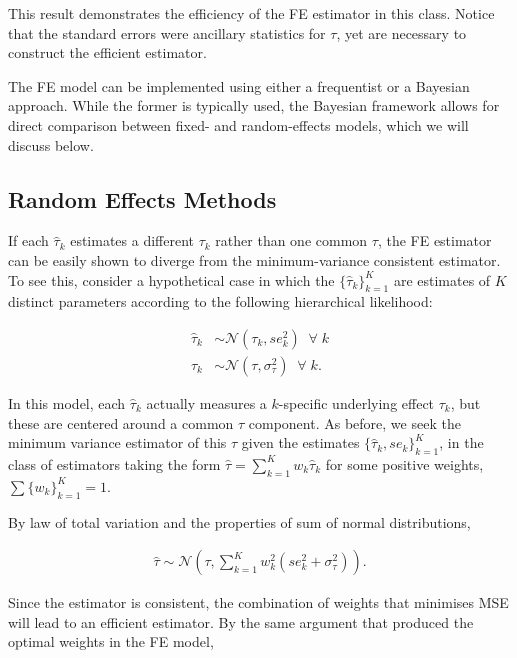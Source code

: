 \documentclass[12pt]{article}
\begin{document}
This result demonstrates the efficiency of the FE estimator in this class. Notice that the standard errors were ancillary statistics for $\tau$, yet are necessary to construct the efficient estimator. 

The FE model can be implemented using either a frequentist or a Bayesian approach. While the former is typically used, the Bayesian framework allows for direct comparison between fixed- and random-effects models, which we will discuss below. 



\subsection{Random Effects Methods}

If each $\hat{\tau}_k$ estimates a different $\tau_k$ rather than one common $\tau$, the FE estimator can be easily shown to diverge from the minimum-variance consistent estimator. To see this, consider a hypothetical case in which the $\{\hat{\tau}_k\}_{k=1}^K$ are estimates of $K$ distinct parameters according to the following hierarchical likelihood:

\begin{equation}\label{rubin}
\begin{aligned}
\hat{\tau}_k &\sim \mathcal{N}(\tau_k, se^2_{k}) \; \; \forall \;k\\
\tau_k &\sim \mathcal{N}(\tau, \sigma^2_{\tau}) \; \; \forall\; k.
\end{aligned}
\end{equation}

In this model, each $\hat{\tau}_k$ actually measures a $k$-specific underlying effect $\tau_k$, but these are centered around a common $\tau$ component. As before, we seek the minimum variance estimator of this $\tau$ given the estimates $\{\hat{\tau}_k, se_k\}_{k=1}^K$, in the class of estimators taking the form  $\hat{\tau} = \sum_{k=1}^{K} w_k \hat{\tau}_k$ for some positive weights, $\sum \{w_k\}_{k=1}^K =1$. 

By law of total variation and the properties of sum of normal distributions,

\begin{equation}
\begin{aligned}
\hat{\tau} \sim \mathcal{N}(\tau, \sum_{k=1}^{K} w_k^2( se^2_{k} + \sigma^2_{\tau})).
\end{aligned}
\end{equation}

Since the estimator is consistent, the combination of weights that minimises MSE will lead to an efficient estimator. By the same argument that produced the optimal weights in the FE model, 
\end{document}
